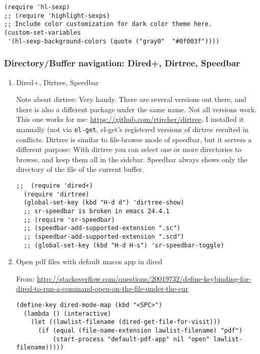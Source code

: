 \documentclass[nofonts]{tufte-handout}
\begin{document}
\begin{verbatim}
(require 'hl-sexp)
;; (require 'highlight-sexps)
;; Include color customization for dark color theme here.
(custom-set-variables
 '(hl-sexp-background-colors (quote ("gray0"  "#0f003f"))))
\end{verbatim}

\subsubsection{Directory/Buffer navigation: Dired+, Dirtree, Speedbar}
\label{sec-1-11-18}
\begin{enumerate}
\item Dired+, Dirtree, Speedbar
\label{sec-1-11-18-1}

Note about dirtree:  Very handy.  There are several versions out there, and there is also a different package under the same name.  Not all versions work.  This one works for me: \url{https://github.com/rtircher/dirtree}.  I installed it manually (not via \texttt{el-get}, el-get's registered versions of dirtree resulted in conflicts.  Dirtree is similar to file-browse mode of speedbar, but it servers a different purpose: With dirtree you can select one or more directories to browse, and keep them all in the sidebar.  Speedbar always shows only the directory of the file of the current buffer.

\begin{verbatim}
;;  (require 'dired+)
  (require 'dirtree)
  (global-set-key (kbd "H-d d") 'dirtree-show)
  ;; sr-speedbar is broken in emacs 24.4.1
  ;; (require 'sr-speedbar)
  ;; (speedbar-add-supported-extension ".sc")
  ;; (speedbar-add-supported-extension ".scd")
  ;; (global-set-key (kbd "H-d H-s") 'sr-speedbar-toggle)
\end{verbatim}

\item Open pdf files with default macos app in dired
\label{sec-1-11-18-2}

From: \url{http://stackoverflow.com/questions/20019732/define-keybinding-for-dired-to-run-a-command-open-on-the-file-under-the-cur}

\begin{verbatim}
(define-key dired-mode-map (kbd "<SPC>")
  (lambda () (interactive)
    (let ((lawlist-filename (dired-get-file-for-visit)))
      (if (equal (file-name-extension lawlist-filename) "pdf")
          (start-process "default-pdf-app" nil "open" lawlist-filename)))))
\end{verbatim}
\end{enumerate}
\end{document}
